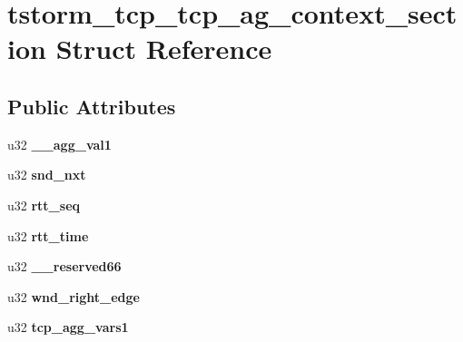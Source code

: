 \hypertarget{structtstorm__tcp__tcp__ag__context__section}{
\section{tstorm\_\-tcp\_\-tcp\_\-ag\_\-context\_\-section Struct Reference}
\label{structtstorm__tcp__tcp__ag__context__section}
}
\subsection*{Public Attributes}
\begin{DoxyCompactItemize}
\item 
\hypertarget{structtstorm__tcp__tcp__ag__context__section_a0de2274aa706c7158d2d499bfcc1bb39}{
u32 {\bfseries \_\-\_\-agg\_\-val1}}
\label{structtstorm__tcp__tcp__ag__context__section_a0de2274aa706c7158d2d499bfcc1bb39}

\item 
\hypertarget{structtstorm__tcp__tcp__ag__context__section_a0c6f7bf77ff40a59b46d633e1ac4a803}{
u32 {\bfseries snd\_\-nxt}}
\label{structtstorm__tcp__tcp__ag__context__section_a0c6f7bf77ff40a59b46d633e1ac4a803}

\item 
\hypertarget{structtstorm__tcp__tcp__ag__context__section_ab9a20033168e86cc5a3373e1c29cd7bc}{
u32 {\bfseries rtt\_\-seq}}
\label{structtstorm__tcp__tcp__ag__context__section_ab9a20033168e86cc5a3373e1c29cd7bc}

\item 
\hypertarget{structtstorm__tcp__tcp__ag__context__section_a19117112023b0912786c907296409b41}{
u32 {\bfseries rtt\_\-time}}
\label{structtstorm__tcp__tcp__ag__context__section_a19117112023b0912786c907296409b41}

\item 
\hypertarget{structtstorm__tcp__tcp__ag__context__section_aeb609c44d5e9c168b6bc8f62fb81f168}{
u32 {\bfseries \_\-\_\-reserved66}}
\label{structtstorm__tcp__tcp__ag__context__section_aeb609c44d5e9c168b6bc8f62fb81f168}

\item 
\hypertarget{structtstorm__tcp__tcp__ag__context__section_a5019497d5e261c725f1fd06b007f2107}{
u32 {\bfseries wnd\_\-right\_\-edge}}
\label{structtstorm__tcp__tcp__ag__context__section_a5019497d5e261c725f1fd06b007f2107}

\item 
\hypertarget{structtstorm__tcp__tcp__ag__context__section_a2761a5f5eb3a81bdd67940bff8258a75}{
u32 {\bfseries tcp\_\-agg\_\-vars1}}
\label{structtstorm__tcp__tcp__ag__context__section_a2761a5f5eb3a81bdd67940bff8258a75}


\end{DoxyCompactItemize}
